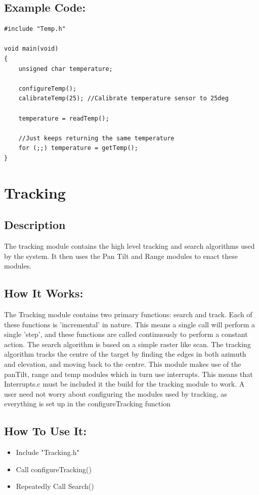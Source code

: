 \documentclass[]{report}
\begin{document}
\section{Example Code:}
\begin{lstlisting}
#include "Temp.h"

void main(void)
{
	unsigned char temperature;
	
	configureTemp();
	calibrateTemp(25); //Calibrate temperature sensor to 25deg
	
	temperature = readTemp();
	
	//Just keeps returning the same temperature
	for (;;) temperature = getTemp();
}
\end{lstlisting}

\chapter{Tracking}
\section{Description}
The tracking module contains the high level tracking and search algorithms used by the system. It then uses the Pan Tilt and Range modules to enact these modules.

\section{How It Works:}
The Tracking module contains two primary functions: search and track. Each of these functions is 'incremental' in nature. This means a single call will perform a single 'step', and these functions are called continuously to perform a constant action. \newline
The search algorithm is based on a simple raster like scan. The tracking algorithm tracks the centre of the target by finding the edges in both azimuth and elevation, and moving back to the centre. \newline
This module makes use of the panTilt, range and temp modules which in turn use interrupts. This means that Interrupts.c must be included it the build for the tracking module to work. A user need not worry about configuring the modules used by tracking, as everything is set up in the configureTracking function

\section{How To Use It:}
\begin{itemize}
	\item Include "Tracking.h"
	\item Call configureTracking()
	\item Repeatedly Call Search()
\end{itemize}
\end{document}
